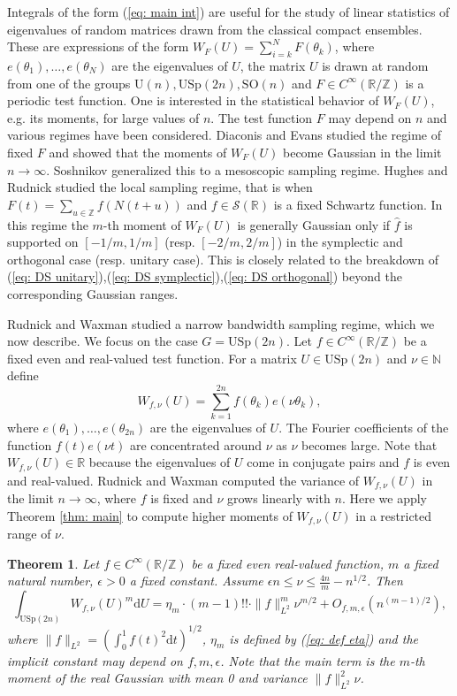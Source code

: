 \documentclass[alphabetic, 
        colorlinks,
        linkcolor=red,  citecolor=blue,
        backref
]{amsart}
\numberwithin{equation}{section}
\newtheorem{thm}{Theorem}
\theoremstyle{definition}
\newcommand{\N}{{\mathbb N}}
\newcommand{\Z}{{\mathbb Z}}
\newcommand{\R}{{\mathbb R}}
\newcommand{\USp}{{\mathrm{USp}}}
\newcommand{\U}{{\mathrm{U}}}
\newcommand{\SO}{{\mathrm{SO}}}
\begin{document}
Integrals of the form (\ref{eq: main int}) are useful for the study of linear statistics of eigenvalues of random matrices drawn from the classical compact ensembles. These are expressions of the form
$W_F(U)=\sum_{i=k}^{N}F(\theta_k)$, where $e(\theta_1),\ldots,e(\theta_N)$ are the eigenvalues of $U$, the matrix $U$ is drawn at random from one of the groups $\U(n),\USp(2n),\SO(n)$ and $F\in C^{\infty}(\R/\Z)$ is a periodic test function. One is interested in the statistical behavior of $W_F(U)$, e.g. its moments, for large values of $n$. The test function $F$ may depend on $n$ and various regimes have been considered. Diaconis and Evans \cite{DiEv01} studied the regime of fixed $F$ and showed that the moments of $W_F(U)$ become Gaussian in the limit $n\to\infty$. Soshnikov \cite{Sos00} generalized this to a mesoscopic sampling regime. Hughes and Rudnick \cite{HuRu03, HuRu03a} studied the local sampling regime, that is when $F(t)=\sum_{u\in\Z}f(N(t+u))$ and $f\in\mathcal S(\R)$ is a fixed Schwartz function. In this regime the $m$-th moment of $W_F(U)$ is generally Gaussian only if $\hat f$ is supported on $[-1/m,1/m]$ (resp. $[-2/m,2/m]$) in the symplectic and orthogonal case (resp. unitary case). This is closely related to the breakdown of (\ref{eq: DS unitary}),(\ref{eq: DS symplectic}),(\ref{eq: DS orthogonal}) beyond the corresponding Gaussian ranges.

Rudnick and Waxman \cite[\S 5]{RuWa19} studied a narrow bandwidth sampling regime, which we now describe. We focus on the case $G=\USp(2n)$. Let $f\in C^{\infty}(\R/\Z)$ be a fixed even and real-valued test function. For a matrix $U\in\USp(2n)$ and $\nu\in\N$ define
$$W_{f,\nu}(U)=\sum_{k=1}^{2n}f(\theta_k)e(\nu\theta_k),$$
where $e(\theta_1),\ldots,e(\theta_{2n})$ are the eigenvalues of $U$. The Fourier coefficients of the function $f(t)e(\nu t)$ are concentrated around $\nu$ as $\nu$ becomes large. Note that $W_{f,\nu}(U)\in\R$ because the eigenvalues of $U$ come in conjugate pairs and $f$ is even and real-valued. Rudnick and Waxman \cite[Proposition 5.3]{RuWa19} computed the variance of $W_{f,\nu}(U)$ in the limit $n\to\infty$, where $f$ is fixed and $\nu$ grows linearly with $n$. Here we apply Theorem \ref{thm: main} to compute higher moments of $W_{f,\nu}(U)$ in a restricted range of $\nu$.


    

\begin{thm}\label{thm: waxman} Let $f\in C^{\infty}(\R/\Z)$ be a fixed even real-valued function, $m$ a fixed natural number, $\epsilon>0$ a fixed constant. Assume $\epsilon n\le \nu\le \frac{4n}m-n^{1/2}$. Then
$$\int_{\USp(2n)}W_{f,\nu}(U)^m\mathrm dU=\eta_m\cdot(m-1)!!\cdot\|f\|_{L^2}^{m}\nu^{m/2}+O_{f,m,\epsilon}\left(n^{(m-1)/2}\right),$$
where
$\|f\|_{L^2}=\left(\int_0^1f(t)^2\mathrm dt\right)^{1/2}$, $\eta_m$ is defined by (\ref{eq: def eta}) and the implicit constant may depend on $f,m,\epsilon$. Note that the main term is the $m$-th moment of the real Gaussian with mean 0 and variance $\|f\|_{L^2}^2\nu$.
\end{thm}
\end{document}
